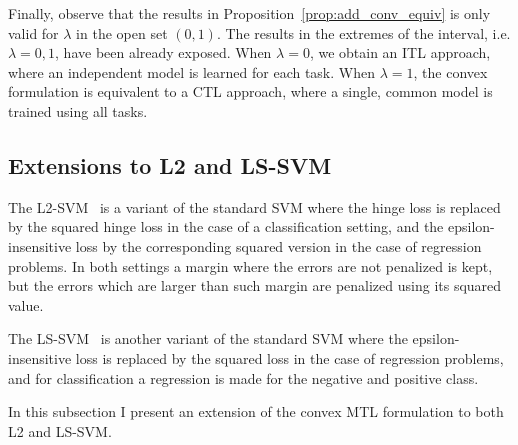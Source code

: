 Finally, observe that the results in Proposition~\ref{prop:add_conv_equiv} is only valid for $\lambda$ in the open set $(0, 1)$. The results in the extremes of the interval, i.e. $\lambda=0, 1$, have been already exposed. When $\lambda=0$, we obtain an ITL approach, where an independent model is learned for each task. When $\lambda=1$, the convex formulation is equivalent to a CTL approach, where a single, common model is trained using all tasks.



\subsection{Extensions to L2 and LS-SVM}\label{subsec:cvx_l2ls-svm}
The L2-SVM~\cite{Burges98} is a variant of the standard SVM where the hinge loss is replaced by the squared hinge loss in the case of a classification setting, and the epsilon-insensitive loss by the corresponding squared version in the case of regression problems. In both settings a margin where the errors are not penalized is kept, but the errors which are larger than such margin are penalized using its squared value.

The LS-SVM~\citep{SuykensV99} is another variant of the standard SVM where the epsilon-insensitive loss is replaced by the squared loss in the case of regression problems, and for classification a regression is made for the  negative and positive class.

In this subsection I present an extension of the convex MTL formulation to both L2 and LS-SVM.

